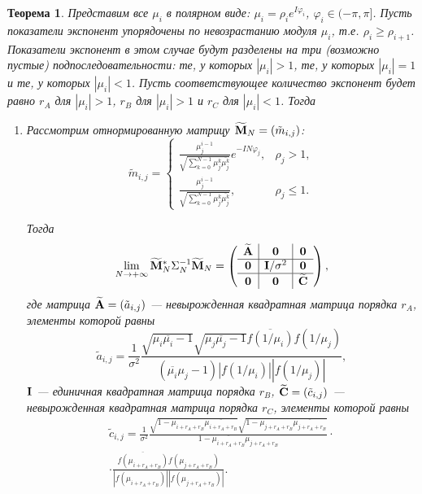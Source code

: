 \documentclass[12pt,a4paper]{article}
\newtheorem{theorem}{Теорема}
\begin{document}
\begin{theorem} \label{th:arinconsistency}
	Представим все $\mu_i$ в полярном виде: $\mu_i = \rho_i e^{I \varphi_i}$, $\varphi_i \in (-\pi, \pi]$. Пусть показатели экспонент упорядочены по невозрастанию модуля $\mu_i$, т.е. $\rho_i \ge \rho_{i+1}$. Показатели экспонент в этом случае будут разделены на три (возможно пустые) подпоследовательности: те, у которых $|\mu_i|>1$, те, у которых $|\mu_i| = 1$ и те, у которых $|\mu_i| < 1$. Пусть соответствующее количество экспонент будет равно $r_A$ для $|\mu_i|>1$, $r_B$ для $|\mu_i|>1$ и $r_C$ для $|\mu_i|<1$. Тогда
	\begin{enumerate}
		\item Рассмотрим отнормированную матрицу $\widetilde {\mathbf{M}}_N = (\tilde m_{i, j})$: 
		\begin{equation*}
		\tilde m_{i, j} = \begin{cases}
		\frac{\mu_j^{i-1}}{\sqrt{\sum_{k=0}^{N-1} \mu_j^k \overline{\mu_j^k}}} e^{-I N \varphi_j}, & \rho_j > 1, \\
		\frac{\mu_j^{i-1}}{\sqrt{\sum_{k=0}^{N-1} \mu_j^k \overline{\mu_j^k}}}, & \rho_j \le 1.
		\end{cases}
		\end{equation*}
		
		Тогда \begin{equation*}
		\lim_{N \to + \infty} \widetilde {\mathbf{M}}_N^* \Sigma_N^{-1} \widetilde {\mathbf{M}}_N = \left( \begin{array}{c|c|c}
		\widetilde {\mathbf{A}} & \mathbf{0} & \mathbf{0} \\ \hline
		\mathbf{0} & \mathbf{I} / \sigma^2& \mathbf{0} \\ \hline
		\mathbf{0} & \mathbf{0} & \widetilde {\mathbf{C}}
		\end{array}  \right),
		\end{equation*}
		где матрица $\widetilde {\mathbf{A}} = (\tilde a_{i, j})$ --- невырожденная квадратная матрица порядка $r_A$, элементы которой равны
		\begin{equation*}
		\tilde a_{i, j} = \frac{1}{\sigma^2} \frac{\sqrt{\mu_i \overline{\mu_i} - 1}\sqrt{\mu_j \overline{\mu_j} - 1} \overline{f(1/\mu_i)} f(1/\mu_j) }{(\overline{\mu_i} \mu_j - 1) |f(1/\mu_i)| |f(1/\mu_j)|},
		\end{equation*}
		$\mathbf{I}$ --- единичная квадратная матрица порядка $r_B$, $\widetilde {\mathbf{C}} = (\tilde c_{i, j})$ --- невырожденная квадратная матрица порядка $r_C$, элементы которой равны
		\begin{multline*}
		\tilde c_{i, j} = \frac{1}{\sigma^2} \frac{\sqrt{1 - \mu_{i+r_A+r_B} \overline{\mu_{i+r_A+r_B}}}\sqrt{1 - \mu_{j+r_A+r_B} \overline{\mu_{j+r_A+r_B}}}}{1 - \overline{\mu_{i+r_A+r_B}} \mu_{j+r_A+r_B}} \cdot \\ \cdot \frac{\overline{f(\mu_{i+r_A+r_B})} f(\mu_{j+r_A+r_B})}{|f(\mu_{i+r_A+r_B})| |f(\mu_{j+r_A+r_B})|}.
		\end{multline*}
		

\end{enumerate}
\end{theorem}
\end{document}
